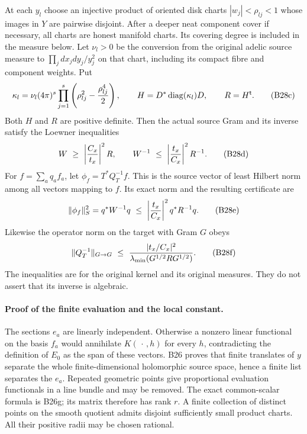 \documentclass[11pt]{article}
\theoremstyle{definition}\newtheorem{definition}[theorem]{Definition}\newtheorem{remark}[theorem]{Remark}
\begin{document}
At each $y_l$ choose an injective product of oriented disk
charts $|w_j|<\rho_{lj}<1$ whose images in $Y$ are pairwise
disjoint.  After a deeper neat component cover if necessary,
all charts are honest manifold charts.  Its covering degree
is included in the measure below.  Let $\nu_l>0$ be the
conversion from the original adelic source measure to
$\prod_j dx_jdy_j/y_j^2$ on that chart, including its compact
fibre and component weights.  Put
\[
 \kappa_l=\nu_l(4\pi)^s
           \prod_{j=1}^s\left(\rho_{lj}^2-
                                      {\rho_{lj}^4\over2}\right),
 \qquad H=D^*\operatorname{diag}(\kappa_l)D,
 \qquad R=H^{\mathsf t}.
 \tag{B28c}
\]
Both $H$ and $R$ are positive definite.  Then the actual
source Gram and its inverse satisfy the Loewner inequalities
\[
    W\ \geq\ \left|{C_x\over t_x}\right|^2R,
    \qquad
    W^{-1}\ \leq\ \left|{t_x\over C_x}\right|^2R^{-1}.
 \tag{B28d}
\]
For $f=\sum_a q_af_a$, let
$\phi_f=T^*Q_T^{-1}f$.  This is the source vector of least
Hilbert norm among all vectors mapping to $f$.  Its exact
norm and the resulting certificate are
\[
 \|\phi_f\|_S^2=q^*W^{-1}q
       \ \leq\ \left|{t_x\over C_x}\right|^2q^*R^{-1}q.
 \tag{B28e}
\]
Likewise the operator norm on the target with Gram $G$ obeys
\[
 \|Q_T^{-1}\|_{G\to G}\ \leq\
 { |t_x/C_x|^2\over
           \lambda_{\min}(G^{1/2}RG^{1/2})}.
 \tag{B28f}
\]
The inequalities are for the original kernel and its original
measures.  They do not assert that its inverse is algebraic.

\paragraph{Proof of the finite evaluation and the local constant.}
The sections $e_a$ are linearly independent.  Otherwise a
nonzero linear functional on the basis $f_a$ would annihilate
$K(\,\cdot\,,h)$ for every $h$, contradicting the definition
of $E_0$ as the span of these vectors.  B26 proves that finite
translates of $y$ separate the whole finite-dimensional
holomorphic source space, hence a finite list separates the
$e_a$.  Repeated geometric points give proportional evaluation
functionals in a line bundle and may be removed.  The exact
common-scalar formula is B26g; its matrix therefore has rank
$r$.  A finite collection of distinct points on the smooth
quotient admits disjoint sufficiently small product charts.
All their positive radii may be chosen rational.
\end{document}
